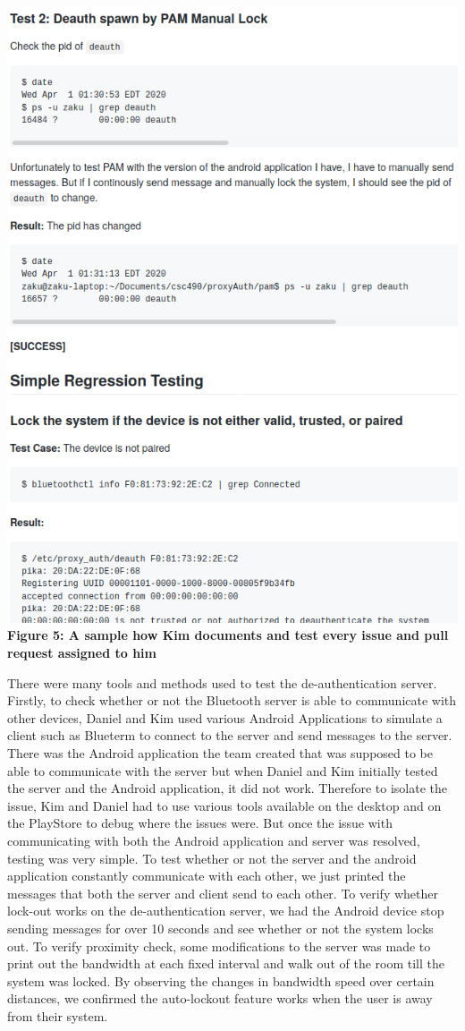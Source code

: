 \documentclass[letterpaper,twocolumn,10pt]{article}
\begin{document}
{{\includegraphics[scale=0.3]{kim_documentation.png}\\
\textbf{Figure 5: A sample how Kim documents and test every issue and pull request assigned to him}

There were many tools and methods used to test the de-authentication server. Firstly, to check whether or not the Bluetooth server is able to communicate with other devices, Daniel and Kim used various Android Applications to simulate a client such as Blueterm to connect to the server and send messages to the server. There was the Android application the team created that was supposed to be able to communicate with the server but when Daniel and Kim initially tested the server and the Android application, it did not work. Therefore to isolate the issue, Kim and Daniel had to use various tools available on the desktop and on the PlayStore to debug where the issues were. But once the issue with communicating with both the Android application and server was resolved, testing was very simple. To test whether or not the server and the android application constantly communicate with each other, we just printed the messages that both the server and client send to each other. To verify whether lock-out works on the de-authentication server, we had the Android device stop sending messages for over 10 seconds and see whether or not the system locks out. To verify proximity check, some modifications to the server was made to print out the bandwidth at each fixed interval and walk out of the room till the system was locked. By observing the changes in bandwidth speed over certain distances, we confirmed the auto-lockout feature works when the user is away from their system.

}}
\end{document}

